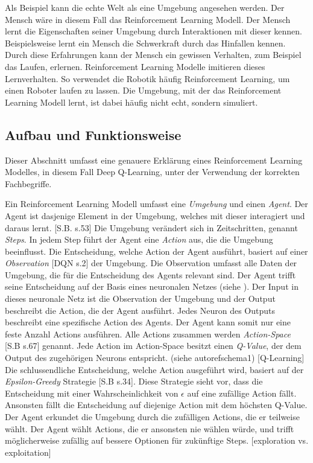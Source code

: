 Als Beispiel kann die echte Welt als eine Umgebung angesehen werden. Der Mensch
wäre in diesem Fall das Reinforcement Learning Modell. Der Mensch lernt die
Eigenschaften seiner Umgebung durch Interaktionen mit dieser kennen.
Beispielsweise lernt ein Mensch die Schwerkraft durch das Hinfallen kennen.
Durch diese Erfahrungen kann der Mensch ein gewissen Verhalten, zum Beispiel das
Laufen, erlernen. Reinforcement Learning Modelle imitieren dieses Lernverhalten.
So verwendet die Robotik häufig Reinforcement Learning, um einen Roboter laufen
zu lassen. Die Umgebung, mit der das Reinforcement Learning Modell lernt, ist
dabei häufig nicht echt, sondern simuliert.

\subsection{Aufbau und Funktionsweise}
\label{sub:t_rl_func}
Dieser Abschnitt umfasst eine genauere Erklärung eines Reinforcement Learning
Modelles, in diesem Fall Deep Q-Learning, unter der Verwendung der korrekten
Fachbegriffe.

Ein Reinforcement Learning Modell umfasst eine \emph{Umgebung} und einen
\emph{Agent}. Der Agent ist dasjenige Element in der Umgebung, welches mit
dieser interagiert und daraus lernt. [S.B. s.53] Die Umgebung verändert sich in
Zeitschritten, genannt \emph{Steps}. In jedem Step führt der Agent eine
\emph{Action} aus, die die Umgebung beeinflusst. Die Entscheidung, welche Action
der Agent ausführt, basiert auf einer \emph{Observation} [DQN s.2] der Umgebung.
Die Observation umfasst alle Daten der Umgebung, die für die Entscheidung des
Agents relevant sind. Der Agent trifft seine Entscheidung auf der Basis eines
neuronalen Netzes (siehe ). Der Input in dieses neuronale
Netz ist die Observation der Umgebung und der Output beschreibt die Action, die
der Agent ausführt. Jedes Neuron des Outputs beschreibt eine spezifische Action
des Agents. Der Agent kann somit nur eine feste Anzahl Actions ausführen. Alle
Actions zusammen werden \emph{Action-Space} [S.B s.67] genannt. Jede Action im
Action-Space besitzt einen \emph{Q-Value}, der dem Output des zugehörigen
Neurons entspricht. (siehe autoref{schema1}) [Q-Learning] Die schlussendliche
Entscheidung, welche Action ausgeführt wird, basiert auf der
\emph{Epsilon-Greedy} Strategie [S.B s.34]. Diese Strategie sieht vor, dass die
Entscheidung mit einer Wahrscheinlichkeit von $\epsilon$ auf eine zufällige
Action fällt. Ansonsten fällt die Entscheidung auf diejenige Action mit dem
höchsten Q-Value. Der Agent erkundet die Umgebung durch die zufälligen Actions,
die er teilweise wählt. Der Agent wählt Actions, die er ansonsten nie wählen
würde, und trifft möglicherweise zufällig auf bessere Optionen für zukünftige
Steps. [exploration vs. exploitation] 

